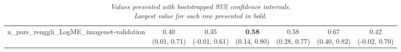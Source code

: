 \begin{table}[H]
\begin{tabular}{c|cccccc}
\hline
n_pars_renggli_LogME_imagenet-validation & \makecell{0.40 \\[0pt] (0.01, 0.71)} & \makecell{0.35 \\[0pt] (-0.01, 0.61)} & \makecell{\textbf{0.58} \\[0pt] (0.14, 0.80)} & \makecell{0.58 \\[0pt] (0.28, 0.77)} & \makecell{0.67 \\[0pt] (0.40, 0.82)} & \makecell{0.42 \\[0pt] (-0.02, 0.70)} \\
\end{tabular}
\caption*{\\\textit{Values presented with bootstrapped 95\% confidence intervals.\\
Largest value for each row presented in bold.}}
\end{table}
